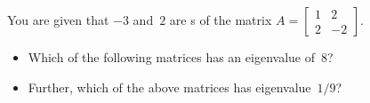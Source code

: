 \begin{activity}
You are given that \(-3\) and~\(2\) are s of the matrix \(A=\begin{bmatrix} 1&2\\2&-2 \end{bmatrix}\).
\begin{itemize}
\item Which of the following matrices has an eigenvalue of~\(8\)?
\item Further, which of the above matrices has eigenvalue~\(1/9\)?
\end{itemize}
\end{activity}






